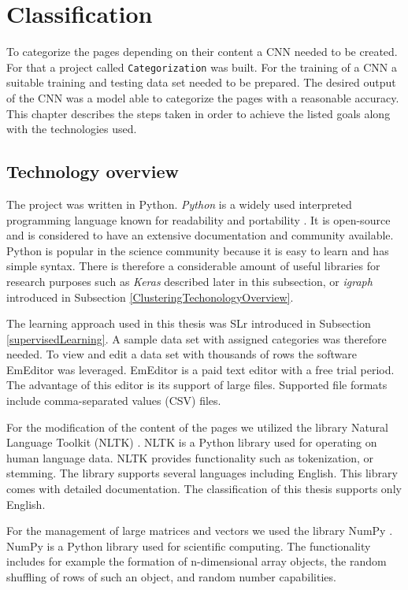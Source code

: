 \section{Classification} \label{ClassificationDevelopment}
To categorize the pages depending on their content a CNN needed to be created. For that a project called \texttt{Categorization} was built. For the training of a CNN a suitable training and testing data set needed to be prepared. The desired output of the CNN was a model able to categorize the pages with a reasonable accuracy. This chapter describes the steps taken in order to achieve the listed goals along with the technologies used.

\subsection{Technology overview} \label{ClassificationTechonologyOverview}
The project was written in Python. \textit{Python} is a widely used interpreted programming language known for readability and portability \cite{aboutPython}. It is open-source and is considered to have an extensive documentation and community available. Python is popular in the science community because it is easy to learn and has simple syntax. There is therefore a considerable amount of useful libraries for research purposes such as \textit{Keras} described later in this subsection, or \textit{igraph} introduced in Subsection \ref{ClusteringTechonologyOverview}.  

The learning approach used in this thesis was SLr introduced in Subsection \ref{supervisedLearning}. A sample data set with assigned categories was therefore needed. To view and edit a data set with thousands of rows the software EmEditor \cite{emeditor} was leveraged. EmEditor is a paid text editor with a free trial period. The advantage of this editor is its support of large files. Supported file formats include comma-separated values (CSV) files. 

For the modification of the content of the pages we utilized the library Natural Language Toolkit (NLTK) \cite{nltk}. NLTK is a Python library used for operating on human language data. NLTK provides functionality such as tokenization, or stemming. The library supports several languages including English. This library comes with detailed documentation. The classification of this thesis supports only English.

For the management of large matrices and vectors we used the library NumPy \cite{numpy}. NumPy is a Python library used for scientific computing. The functionality includes for example the formation of n-dimensional array objects, the random shuffling of rows of such an object, and random number capabilities. 

